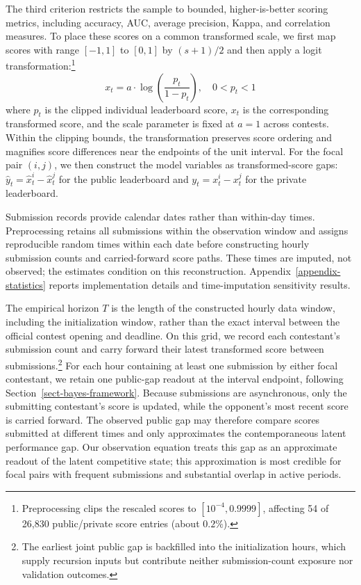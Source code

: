 \documentclass[mnsc]{informs3}
\begin{document}
The third criterion restricts the sample to bounded, higher-is-better scoring metrics, including accuracy, AUC, average precision, Kappa, and correlation measures. To place these scores on a common transformed scale, we first map scores with range $[-1,1]$ to $[0,1]$ by $(s+1)/2$ and then apply a logit transformation:\footnote{Preprocessing clips the rescaled scores to $[10^{-4},0.9999]$, affecting 54 of 26,830 public/private score entries (about $0.2\%$).}
\begin{equation}\label{eq-leaderboard-transform}
x_t = a \cdot \log\left(\frac{p_t}{1-p_t}\right), \quad 0<p_t<1
\end{equation}
where $p_t$ is the clipped individual leaderboard score, $x_t$ is the corresponding transformed score, and the scale parameter is fixed at $a=1$ across contests.
Within the clipping bounds, the transformation preserves score ordering and magnifies score differences near the endpoints of the unit interval.
For the focal pair $(i,j)$, we then construct the model variables as transformed-score gaps: $\hat y_t=\hat x_t^i-\hat x_t^j$ for the public leaderboard and $y_t=x_t^i-x_t^j$ for the private leaderboard.

Submission records provide calendar dates rather than within-day times. Preprocessing retains all submissions within the observation window and assigns reproducible random times within each date before constructing hourly submission counts and carried-forward score paths. These times are imputed, not observed; the estimates condition on this reconstruction. Appendix~\ref{appendix-statistics} reports implementation details and time-imputation sensitivity results.

The empirical horizon $T$ is the length of the constructed hourly data window, including the initialization window, rather than the exact interval between the official contest opening and deadline. On this grid, we record each contestant's submission count and carry forward their latest transformed score between submissions.\footnote{The earliest joint public gap is backfilled into the initialization hours, which supply recursion inputs but contribute neither submission-count exposure nor validation outcomes.} For each hour containing at least one submission by either focal contestant, we retain one public-gap readout at the interval endpoint, following Section~\ref{sect-bayes-framework}.
Because submissions are asynchronous, only the submitting contestant’s score is updated, while the opponent’s most recent score is carried forward. 
The observed public gap may therefore compare scores submitted at different times and only approximates the contemporaneous latent performance gap.
Our observation equation treats this gap as an approximate readout of the latent competitive state; this approximation is most credible for focal pairs with frequent submissions and substantial overlap in active periods.
\end{document}
